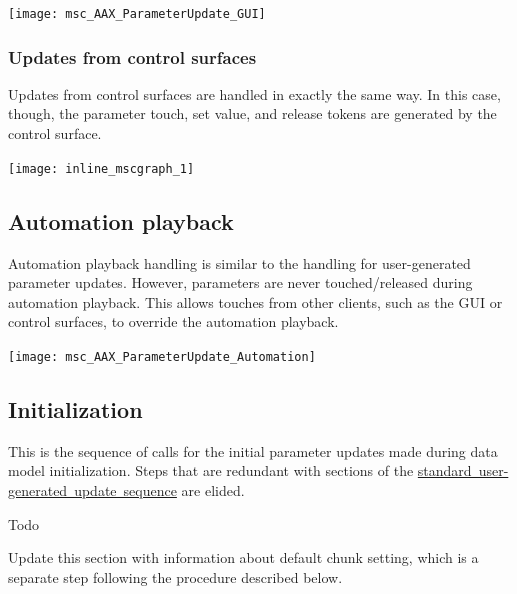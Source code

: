 \begin{DoxyImage}
\texttt{[image: msc\_AAX\_ParameterUpdate\_GUI]}
\end{DoxyImage}
 \hypertarget{a00823_parameterUpdates_sequences_user_controlsurface}{}\subsubsection{Updates from control surfaces}\label{a00823_parameterUpdates_sequences_user_controlsurface}
Updates from control surfaces are handled in exactly the same way. In this case, though, the parameter touch, set value, and release tokens are generated by the control surface.


\begin{DoxyImageNoCaption}
  \mbox{\texttt{[image: inline\_mscgraph\_1]}}
\end{DoxyImageNoCaption}
\hypertarget{a00823_parameterUpdates_sequences_automation}{}\subsection{Automation playback}\label{a00823_parameterUpdates_sequences_automation}
Automation playback handling is similar to the handling for user-\/generated parameter updates. However, parameters are never touched/released during automation playback. This allows touches from other clients, such as the G\+UI or control surfaces, to override the automation playback.


\begin{DoxyImage}
\texttt{[image: msc\_AAX\_ParameterUpdate\_Automation]}
\end{DoxyImage}
 \hypertarget{a00823_parameterUpdates_sequences_initialization}{}\subsection{Initialization}\label{a00823_parameterUpdates_sequences_initialization}
This is the sequence of calls for the initial parameter updates made during data model initialization. Steps that are redundant with sections of the \mbox{\hyperlink{a00823_parameterUpdates_sequences_user_details}{standard user-\/generated update sequence}} are elided.

\begin{DoxyRefDesc}{Todo}
\item[\mbox{\hyperlink{a00785__todo000002}{Todo}}]Update this section with information about default chunk setting, which is a separate step following the procedure described below.\end{DoxyRefDesc}



